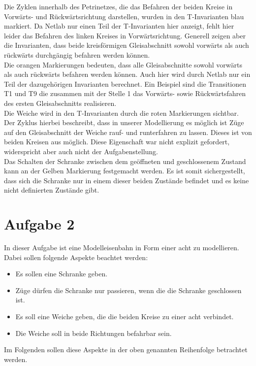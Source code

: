 \documentclass[10pt]{scrartcl}
\begin{document}
Die Zyklen innerhalb des Petrinetzes, die das Befahren der beiden Kreise in Vorwärts- und Rückwärtsrichtung darstellen, wurden in den T-Invarianten blau markiert.
Da Netlab nur einen Teil der T-Invarianten hier anzeigt, fehlt hier leider das Befahren des linken Kreises in Vorwärtsrichtung.
Generell zeigen aber die Invarianten, dass beide kreisförmigen Gleisabschnitt sowohl vorwärts als auch rückwärts durchgängig befahren werden können.\\

Die orangen Markierungen bedeuten, dass alle Gleisabschnitte sowohl vorwärts als auch rückwärts befahren werden können.
Auch hier wird durch Netlab nur ein Teil der dazugehörigen Invarianten berechnet.
Ein Beispiel sind die Transitionen T1 und T9 die zusammen mit der Stelle 1 das Vorwärts- sowie Rückwärtsfahren des ersten Gleisabschnitts realisieren.\\

Die Weiche wird in den T-Invarianten durch die roten Markierungen sichtbar.
Der Zyklus hierbei beschreibt, dass in unserer Modellierung es möglich ist Züge auf den Gleisabschnitt der Weiche rauf- und runterfahren zu lassen.
Dieses ist von beiden Kreisen aus möglich.
Diese Eigenschaft war nicht explizit gefordert, widerspricht aber auch nicht der Aufgabenstellung.\\

Das Schalten der Schranke zwischen dem geöffneten und geschlossenem Zustand kann an der Gelben Markierung festgemacht werden.
Es ist somit sichergestellt, dass sich die Schranke nur in einem dieser beiden Zustände befindet und es keine nicht definierten Zustände gibt. 
 

\section{Aufgabe 2}
In dieser Aufgabe ist eine Modelleisenbahn in Form einer acht zu modellieren.
Dabei sollen folgende Aspekte beachtet werden:
\begin{itemize}
	\item Es sollen eine Schranke geben.
	\item Züge dürfen die Schranke nur passieren, wenn die die Schranke geschlossen ist.
	\item Es soll eine Weiche geben, die die beiden Kreise zu einer acht verbindet.
	\item Die Weiche soll in beide Richtungen befahrbar sein.
\end{itemize}
Im Folgenden sollen diese Aspekte in der oben genannten Reihenfolge betrachtet werden.
\end{document}
